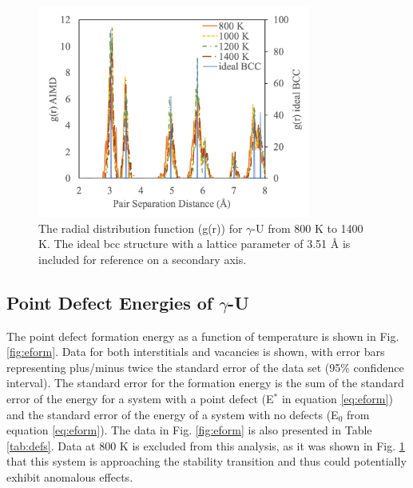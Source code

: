 \documentclass[review]{elsarticle}
\begin{document}
\begin{figure}[h]
 \centering
 \includegraphics[width=0.8\textwidth]{rdf_final.png} 
 \caption{The radial distribution function (g(r)) for $\gamma$-U from 800 K to 1400 K. The ideal bcc structure with a lattice parameter of 3.51 {\AA} is included for reference on a secondary axis.  }
 \label{fig:rdf}
\end{figure}

\FloatBarrier

\subsection{Point Defect Energies of $\gamma$-U}

The point defect formation energy as a function of temperature is shown in Fig. \ref{fig:eform}. Data for both interstitials and vacancies is shown, with error bars representing plus/minus twice the standard error of the data set (95\% confidence interval). The standard error for the formation energy is the sum of the standard error of the energy for a system with a point defect (E$^*$ in equation \ref{eq:eform}) and the standard error of the energy of a system with no defects (E$_0$ from equation \ref{eq:eform}). The data in Fig. \ref{fig:eform} is also presented in Table \ref{tab:defs}. Data at 800 K is excluded from this analysis, as it was shown in Fig. \ref{fig:rdf} that this system is approaching the stability transition and thus could potentially exhibit anomalous effects. 
\end{document}
